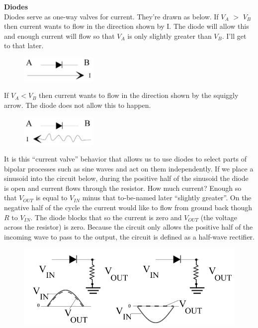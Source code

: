 \documentclass[12pt]{article}
\begin{document}
\begin{enumerate}[1.]
{\bf Diodes}\\
Diodes serve as one-way valves for current. 
They're drawn as below. If $V_A$ $>$ $V_B$ then current wants 
to flow in the direction shown by I. 
The diode will allow this and enough current will flow so that $V_A$ is only slightly greater than $V_B$.
I'll get to that later.
\begin{figure}[!ht]
\begin{center}
\includegraphics[width=0.33\textwidth,trim=0 0 0 0,clip=false]{diode1.png}
\end{center}
\end{figure}
\par If $V_A < V_B$ then current wants to flow in the direction shown by the squiggly arrow. 
The diode does not allow this to happen.
\begin{figure}[!ht]
\begin{center}
\includegraphics[width=0.33\textwidth,trim=0 0 0 0,clip=false]{diode2.png}
\end{center}
\end{figure}
\par It is this ``current valve'' behavior that allows us to use diodes to select parts of bipolar processes such as sine waves and act on them independently. 
If we place a sinusoid into the circuit below, during the positive half of the sinusoid the diode is open and current flows through the resistor. 
How much current? 
Enough so that $V_{OUT}$ is equal to $V_{IN}$ minus that to-be-named later ``slightly greater''.
On the negative half of the cycle the current would like to flow from ground back though $R$ to $V_{IN}$. 
The diode blocks that so the current is zero and $V_{OUT}$ (the voltage across the resistor) is zero.
Because the circuit only allows the positive half of the incoming wave to pass to the output, the circuit is defined as a half-wave rectifier.
\begin{figure}[!ht]
\begin{center}
\includegraphics[width=\textwidth,trim=0 0 0 0,clip=false]{hwrectifier.png}

\end{center}
\end{figure}
\end{enumerate}
\end{document}
